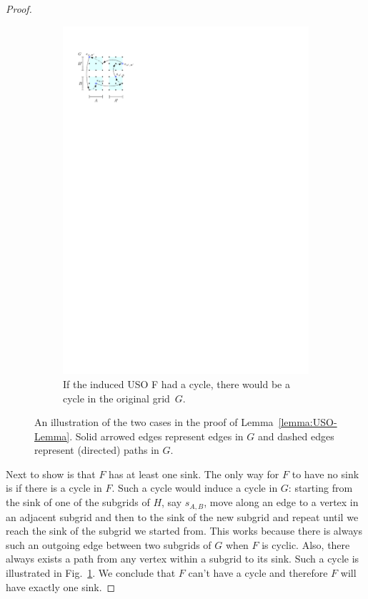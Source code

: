 \documentclass[runningheads,a4paper]{llncs}
\begin{document}
\begin{proof}
\begin{figure}
\begin{subfigure}[t]{0.44\textwidth}
\includegraphics{product_lemma_cycle.pdf}
\caption{\small If the induced USO F had a cycle, there would be a cycle in the original grid~$G$.}
\label{fig:InducedUSOcycle}
\end{subfigure}
\caption{An illustration of the two cases in the proof of Lemma~\ref{lemma:USO-Lemma}. Solid arrowed edges represent edges in $G$ and dashed edges represent (directed) paths in $G$.}
\label{fig:inducesUSOboth}
\end{figure}

Next to show is that $F$ has at least one sink. The only way for $F$ to have no sink is if there is a cycle in $F$. 
Such a cycle would induce a cycle in $G$: starting from the sink of one of the subgrids of $H$, say $s_{A,B}$, move along an edge to 
a vertex in an adjacent subgrid and then to the sink of the new subgrid and repeat until we reach the sink of the subgrid we started from. 
This works because there is always such an outgoing edge between two subgrids of $G$ when $F$ is cyclic.  Also, there always exists a path from any vertex within a subgrid to its sink. Such a cycle is illustrated in Fig.~\ref{fig:InducedUSOcycle}. 
We conclude that $F$ can't have a cycle and therefore $F$ will have exactly one sink.


\end{proof}
\end{document}
